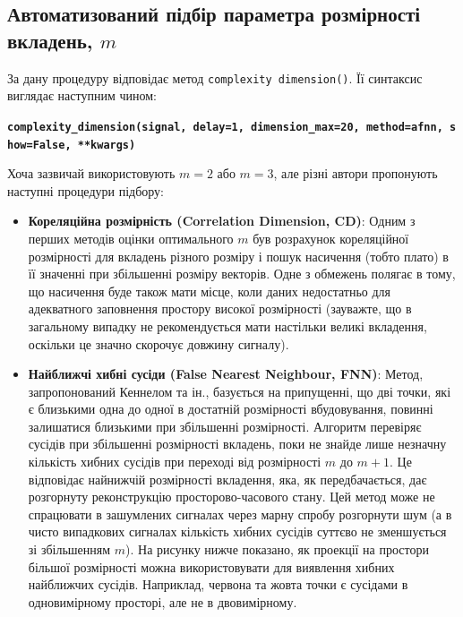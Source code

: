 \documentclass[
  letterpaper,
]{report}
\providecommand{\tightlist}{%
  \setlength{\itemsep}{0pt}\setlength{\parskip}{0pt}}\usepackage{longtable,booktabs,array}
\begin{document}
\hypertarget{ux430ux432ux442ux43eux43cux430ux442ux438ux437ux43eux432ux430ux43dux438ux439-ux43fux456ux434ux431ux456ux440-ux43fux430ux440ux430ux43cux435ux442ux440ux430-ux440ux43eux437ux43cux456ux440ux43dux43eux441ux442ux456-ux432ux43aux43bux430ux434ux435ux43dux44c-m}{%
\subsection{\texorpdfstring{Автоматизований підбір параметра розмірності
вкладень,
\(m\)}{Автоматизований підбір параметра розмірності вкладень, m}}\label{ux430ux432ux442ux43eux43cux430ux442ux438ux437ux43eux432ux430ux43dux438ux439-ux43fux456ux434ux431ux456ux440-ux43fux430ux440ux430ux43cux435ux442ux440ux430-ux440ux43eux437ux43cux456ux440ux43dux43eux441ux442ux456-ux432ux43aux43bux430ux434ux435ux43dux44c-m}}

За дану процедуру відповідає метод \texttt{complexity\ dimension()}. Її
синтаксис виглядає наступним чином:

\textbf{\texttt{complexity\_dimension(signal,\ delay=1,\ dimension\_max=20,\ method=\textquotesingle{}afnn\textquotesingle{},\ show=False,\ **kwargs)}}

Хоча зазвичай використовують \(m=2\) або \(m=3\), але різні автори
пропонують наступні процедури підбору:

\begin{itemize}
\tightlist
\item
  \textbf{Кореляційна розмірність (Correlation Dimension, CD)}: Одним з
  перших методів оцінки оптимального \(m\) був розрахунок кореляційної
  розмірності для вкладень різного розміру і пошук насичення (тобто
  плато) в її значенні при збільшенні розміру векторів. Одне з обмежень
  полягає в тому, що насичення буде також мати місце, коли даних
  недостатньо для адекватного заповнення простору високої розмірності
  (зауважте, що в загальному випадку не рекомендується мати настільки
  великі вкладення, оскільки це значно скорочує довжину сигналу).
\item
  \textbf{Найближчі хибні сусіди (False Nearest Neighbour, FNN)}: Метод,
  запропонований Кеннелом та ін., базується на припущенні, що дві точки,
  які є близькими одна до одної в достатній розмірності вбудовування,
  повинні залишатися близькими при збільшенні розмірності. Алгоритм
  перевіряє сусідів при збільшенні розмірності вкладень, поки не знайде
  лише незначну кількість хибних сусідів при переході від розмірності
  \(m\) до \(m+1\). Це відповідає найнижчій розмірності вкладення, яка,
  як передбачається, дає розгорнуту реконструкцію просторово-часового
  стану. Цей метод може не спрацювати в зашумлених сигналах через марну
  спробу розгорнути шум (а в чисто випадкових сигналах кількість хибних
  сусідів суттєво не зменшується зі збільшенням \(m\)). На рисунку нижче
  показано, як проекції на простори більшої розмірності можна
  використовувати для виявлення хибних найближчих сусідів. Наприклад,
  червона та жовта точки є сусідами в одновимірному просторі, але не в
  двовимірному.
\end{itemize}
\end{document}
